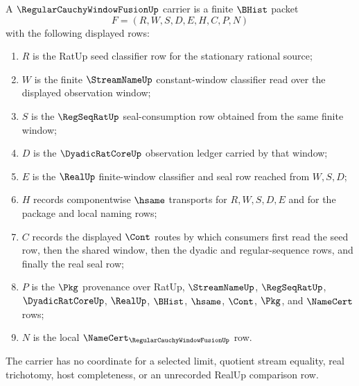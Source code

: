 \begin{definition}
\label{def:regular-cauchy-window-fusion-carrier}
A $\RegularCauchyWindowFusionUp$ carrier is a finite $\BHist$ packet
$$
F=(R,W,S,D,E,H,C,P,N)
$$
with the following displayed rows:
\begin{enumerate}
\item $R$ is the RatUp seed classifier row for the stationary rational source;
\item $W$ is the finite $\StreamNameUp$ constant-window classifier read over the displayed observation window;
\item $S$ is the $\RegSeqRatUp$ seal-consumption row obtained from the same finite window;
\item $D$ is the $\DyadicRatCoreUp$ observation ledger carried by that window;
\item $E$ is the $\RealUp$ finite-window classifier and seal row reached from $W,S,D$;
\item $H$ records componentwise $\hsame$ transports for $R,W,S,D,E$ and for the package and local naming rows;
\item $C$ records the displayed $\Cont$ routes by which consumers first read the seed row, then the shared window, then the dyadic and regular-sequence rows, and finally the real seal row;
\item $P$ is the $\Pkg$ provenance over RatUp, $\StreamNameUp$, $\RegSeqRatUp$, $\DyadicRatCoreUp$, $\RealUp$, $\BHist$, $\hsame$, $\Cont$, $\Pkg$, and $\NameCert$ rows;
\item $N$ is the local $\NameCert_{\RegularCauchyWindowFusionUp}$ row.
\end{enumerate}
The carrier has no coordinate for a selected limit, quotient stream equality, real trichotomy, host completeness, or an unrecorded RealUp comparison row.
\end{definition}

